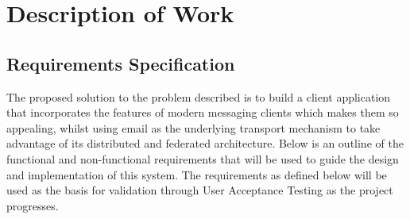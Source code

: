 \chapter{Description of Work}

\section{Requirements Specification}
The proposed solution to the problem described is to build a client application that incorporates the features of modern messaging clients which makes them so appealing, whilst using email as the underlying transport mechanism to take advantage of its distributed and federated architecture. Below is an outline of the functional and non-functional requirements that will be used to guide the design and implementation of this system. The requirements as defined below will be used as the basis for validation through User Acceptance Testing as the project progresses.

